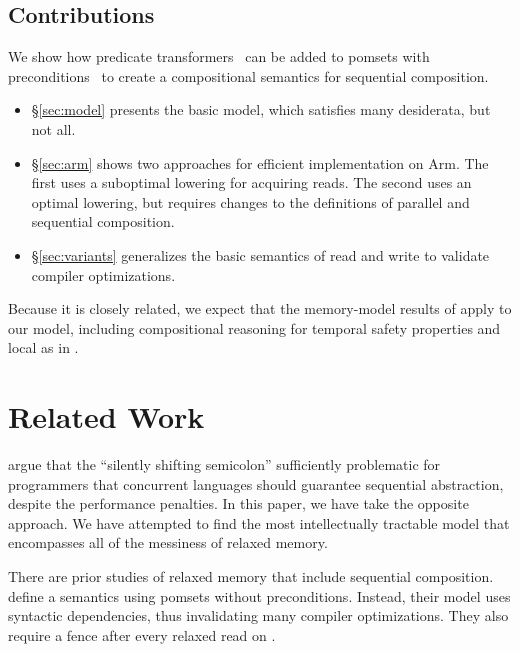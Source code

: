 \subsection{Contributions}

We show how predicate transformers~\cite{DBLP:journals/cacm/Dijkstra75} can
be added to pomsets with
preconditions~\cite{DBLP:journals/pacmpl/JagadeesanJR20} to create a
compositional semantics for sequential composition.
\begin{itemize}
\item \S\ref{sec:model} presents the basic model, which satisfies many
  desiderata, but not all.
\item \S\ref{sec:arm} shows two approaches for efficient implementation on
  Arm.  The first uses a suboptimal lowering for acquiring reads.  The second
  uses an optimal lowering, but requires changes to the definitions of
  parallel and sequential composition.
\item \S\ref{sec:variants} generalizes the basic semantics of read and write
  to validate compiler optimizations.
\end{itemize}
Because it is closely related, we expect that the memory-model results of
\cite{DBLP:journals/pacmpl/JagadeesanJR20} apply to our model, including
compositional reasoning for temporal safety properties and {local} \drfsc{}
as in \cite{Dolan:2018:BDR:3192366.3192421,DBLP:conf/ppopp/DongolJR19,promising-ldrf}.

\section{Related Work}

\citet{DBLP:conf/snapl/MarinoMMNS15} argue that the ``silently shifting
semicolon'' sufficiently problematic for programmers that concurrent
languages should guarantee sequential abstraction, despite the performance
penalties.  In this paper, we have take the opposite approach.  We have
attempted to find the most intellectually tractable model that encompasses
all of the messiness of relaxed memory.

There are prior studies of relaxed memory that include sequential
composition.  \citet{DBLP:journals/corr/abs-1804-04214} define a semantics
using pomsets without preconditions. Instead, their model uses syntactic
dependencies, thus invalidating many compiler optimizations.  They also
require a fence after every relaxed read on \armeight{}.

